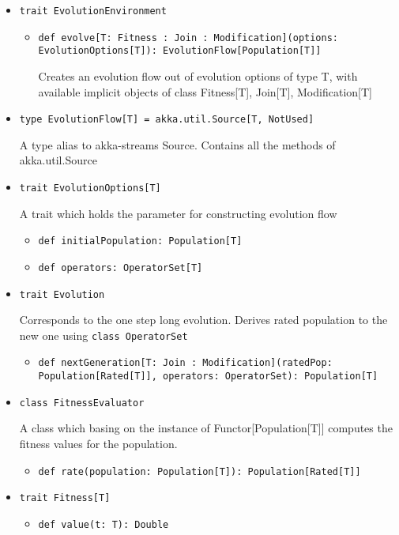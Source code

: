 \begin{itemize}

\item \texttt{trait EvolutionEnvironment}

	\begin{itemize}
		\item \texttt{def evolve[T: Fitness : Join : Modification](options: EvolutionOptions[T]): EvolutionFlow[Population[T]]}

		Creates an evolution flow out of evolution options of type T, with available implicit objects of class Fitness[T], Join[T], Modification[T]
	\end{itemize}

\smallskip
\item \texttt{type EvolutionFlow[T] = akka.util.Source[T, NotUsed]}

A type alias to akka-streams Source. Contains all the methods of akka.util.Source

\smallskip
\item \texttt{trait EvolutionOptions[T]}

A trait which holds the parameter for constructing evolution flow
\begin{itemize}
	\item \texttt{def initialPopulation: Population[T]}
	\item \texttt{def operators: OperatorSet[T]}
\end{itemize}

\smallskip
\item \texttt{trait Evolution}

Corresponds to the one step long evolution. Derives rated population to the new one using \texttt{class OperatorSet}
\begin{itemize}
	\item \texttt{def nextGeneration[T: Join : Modification](ratedPop: Population[Rated[T]], operators: OperatorSet): Population[T]}
\end{itemize}

\smallskip
\item \texttt{class FitnessEvaluator}

A class which basing on the instance of Functor[Population[T]] computes the fitness values for the population.
\begin{itemize}
	\item \texttt{def rate(population: Population[T]): Population[Rated[T]]}
\end{itemize}

\smallskip
\item \texttt{trait Fitness[T]}
\begin{itemize}
	\item \texttt{def value(t: T): Double}
	

\end{itemize}
\end{itemize}
